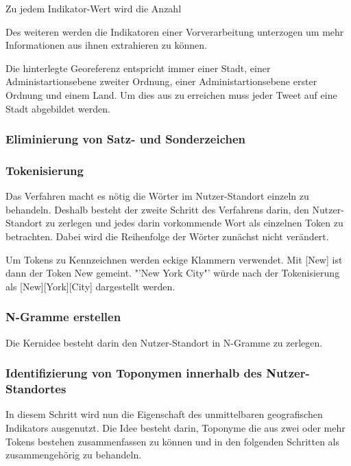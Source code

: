 				Zu jedem Indikator-Wert wird die Anzahl 

				Des weiteren werden die Indikatoren einer Vorverarbeitung unterzogen um mehr Informationen aus ihnen extrahieren zu können. 

				Die hinterlegte Georeferenz entspricht immer einer Stadt, einer Administartionsebene zweiter Ordnung, einer Administartionsebene erster Ordnung und einem Land. 
				Um dies aus zu erreichen muss jeder Tweet auf eine Stadt abgebildet werden.


		  	\subsubsection{Eliminierung von Satz- und Sonderzeichen}

			  	

			\subsubsection{Tokenisierung}

				Das Verfahren macht es nötig die Wörter im Nutzer-Standort einzeln zu behandeln. 
				Deshalb besteht der zweite Schritt des Verfahrens darin, den Nutzer-Standort zu zerlegen und jedes darin vorkommende Wort als einzelnen Token zu betrachten. 
				Dabei wird die Reihenfolge der Wörter zunächst nicht verändert.

				Um Tokens zu Kennzeichnen werden eckige Klammern verwendet.  
				Mit [New] ist dann der Token New gemeint. 
				"'New York City"' würde nach der Tokenisierung als [New][York][City] dargestellt werden. 


			\subsubsection{N-Gramme erstellen}

				Die Kernidee besteht darin den Nutzer-Standort in N-Gramme zu zerlegen. 


		  	\subsubsection{Identifizierung von Toponymen innerhalb des Nutzer-Standortes}
		  		
		  		In diesem Schritt wird nun die Eigenschaft des unmittelbaren geografischen Indikators ausgenutzt.
		  		Die Idee besteht darin, Toponyme die aus zwei oder mehr Tokens bestehen zusammenfassen zu können und in den folgenden Schritten als zusammengehörig zu behandeln.

